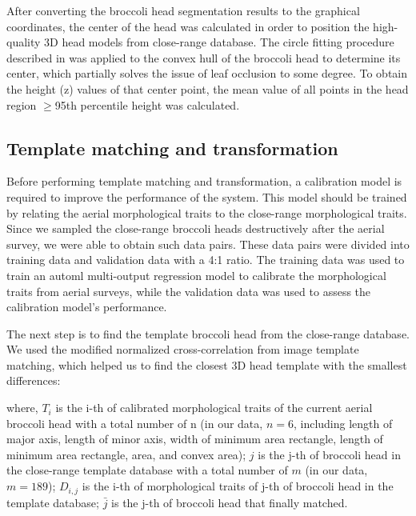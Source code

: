 

After converting the broccoli head segmentation results to the graphical coordinates, the center of the head was calculated in order to position the high-quality 3D head models from close-range database. The circle fitting procedure described in \citet{blok_image_2021} was applied to the convex hull of the broccoli head to determine its center, which partially solves the issue of leaf occlusion to some degree. To obtain the height (z) values of that center point, the mean value of all points in the head region $\geq$95th percentile height was calculated. 

\subsection{Template matching and transformation}

Before performing template matching and transformation, a calibration model is required to improve the performance of the system. This model should be trained by relating the aerial morphological traits to the close-range morphological traits. Since we sampled the close-range broccoli heads destructively after the aerial survey, we were able to obtain such data pairs. These data pairs were divided into training data and validation data with a 4:1 ratio. The training data was used to train an \gls{automl} multi-output regression model \citep{feurer_auto-sklearn_2020} to calibrate the morphological traits from aerial surveys, while the validation data was used to assess the calibration model's performance.

The next step is to find the template broccoli head from the close-range database. We used the modified normalized cross-correlation \citep{yoo_fast_2009} from image template matching, which helped us to find the closest 3D head template with the smallest differences:



\noindent
where, $T_i$ is the i-th of calibrated morphological traits of the current aerial broccoli head with a total number of n (in our data, $n=6$, including length of major axis, length of minor axis, width of minimum area rectangle, length of minimum area rectangle, area, and convex area); $j$ is the j-th of broccoli head in the close-range template database with a total number of $m$ (in our data, $m=189$); $D_{i,j}$ is the i-th of morphological traits of j-th of broccoli head in the template database; $\bar{j}$ is the j-th of broccoli head that finally matched.

